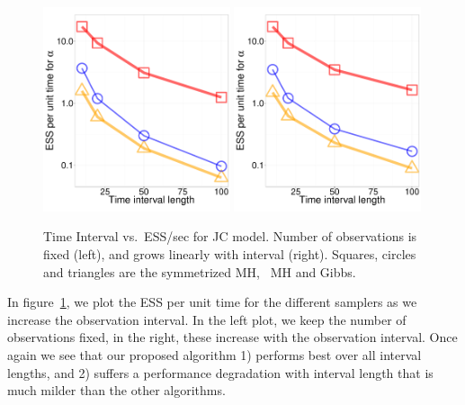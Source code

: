   \begin{figure}%
  \centering
  \begin{minipage}[!hp]{0.58\linewidth}
  \centering
    \includegraphics [width=0.49\textwidth, angle=0]{figs/ESS_vs_t_alpha_JC.pdf}
    \includegraphics [width=0.49\textwidth, angle=0]{figs/ESS_vs_t_alpha_fixobservation_JC.pdf}
  \end{minipage}
  \begin{minipage}[!hp]{0.01\linewidth}
  \end{minipage}
  \begin{minipage}[!hp]{0.4\linewidth}
    \caption{Time Interval vs.\ ESS/sec for JC model. Number of observations is fixed (left), and grows linearly with interval (right). Squares, circles and triangles are the symmetrized MH, \naive\ MH and Gibbs. }
	\label{fig:jc_model_vs_t}
  \end{minipage}
  \end{figure}


In figure~\ref{fig:jc_model_vs_t}, we plot the ESS per unit time for the
different samplers as we increase the observation interval. In the left plot,
we keep the number of observations fixed, in the right, these increase with
the observation interval. Once again we see that our proposed algorithm
1) performs best over all interval lengths, and 2) suffers a performance
degradation with interval length that is much milder than the other algorithms.

